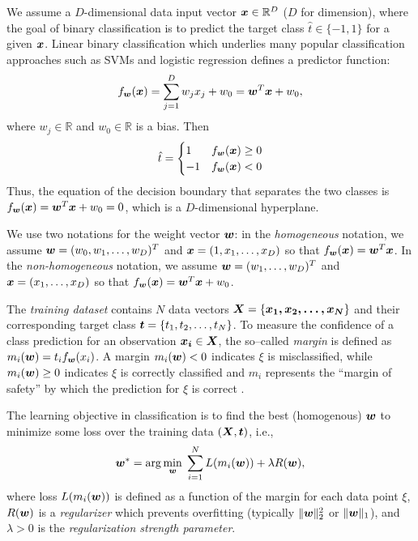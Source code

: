 \ENDCOMMENT

We assume a $D$-dimensional data input vector $\boldsymbol{x} \in \mathbb{R}^D$ ($D$ for
dimension), where the goal of binary classification is to predict the
target class $\hat{t} \in \{ -1, 1 \}$ for a given $\boldsymbol{x}$.  Linear
binary classification which underlies many popular classification
approaches such as SVMs and logistic regression defines a predictor
function:
\begin{equation} 
\label{eq:predictor}
f_{\boldsymbol{w}}(\boldsymbol{x}) = \sum_{j=1}^D w_j x_j + w_0 = \boldsymbol{w}^T \boldsymbol{x} + w_0,
\end{equation}
where $w_j \in \mathbb{R}$ and $w_0 \in \mathbb{R}$ is a bias.  Then
\begin{equation}
\hat{t} = 
  \begin{cases}
  1  & f_{\boldsymbol{w}}(\boldsymbol{x}) \geq 0\\
  -1 & f_{\boldsymbol{w}}(\boldsymbol{x}) <    0
  \end{cases}
\end{equation}
Thus, the equation of the decision boundary that separates the two
classes is $f_{\boldsymbol{w}}(\boldsymbol{x}) = \boldsymbol{w}^T \boldsymbol{x} + w_0 = 0$, which is a
$D$-dimensional hyperplane.

We use two notations for the weight vector $\boldsymbol{w}$: in the
\emph{homogeneous} notation, we assume $\boldsymbol{w} = (w_0,w_1,\ldots,w_D)^T$
and $\boldsymbol{x} = (1,x_1,\ldots,x_D)$ so that $f_{\boldsymbol{w}}(\boldsymbol{x}) = \boldsymbol{w}^T \boldsymbol{x}$.  In the
\emph{non-homogeneous} notation, we assume $\boldsymbol{w} = (w_1,\ldots,w_D)^T$
and $\boldsymbol{x} = (x_1,\ldots,x_D)$ so that $f_{\boldsymbol{w}}(\boldsymbol{x}) = \boldsymbol{w}^T \boldsymbol{x} + w_0$.

The \emph{training dataset} contains $N$ data vectors $\boldsymbol{X} =
\{\boldsymbol{x_1, x_2, \dots, x_N}\}$ and their corresponding target
class $\boldsymbol{t} = \{t_1, t_2, \dots, t_N\}$. To measure the confidence of a
class prediction for an observation $\boldsymbol{x_i} \in \boldsymbol{X}$, the so--called
\emph{margin} is defined as $m_i(\boldsymbol{w}) = t_i f_{\boldsymbol{w}}(x_i)$.  A margin
$m_i(\boldsymbol{w}) < 0$ indicates $\xi$ is misclassified, while $m_i(\boldsymbol{w}) \geq 0$
indicates $\xi$ is correctly classified and $m_i$ represents the
``margin of safety'' by which the prediction for $\xi$ is correct
\cite{McAllester}.

The learning objective in classification is to find the best
(homogenous) $\boldsymbol{w}$ to minimize some loss over the training data
$(\boldsymbol{X},\boldsymbol{t})$, i.e.,
\begin{equation}
\label{eq:objective}
 \boldsymbol{w}^* = \arg\min_{\boldsymbol{w}} \; \sum_{i=1}^{N} L(m_i(\boldsymbol{w})) + \lambda R(\boldsymbol{w}),
\end{equation}
where loss $L(m_i(\boldsymbol{w}))$ is defined as a function of the margin for
each data point $\xi$, $R(\boldsymbol{w})$ is a \emph{regularizer} which
prevents overfitting (typically $\|\boldsymbol{w}\|_2^2$ or $\|\boldsymbol{w}\|_1$), and
$\lambda > 0$ is the \emph{regularization strength parameter}.

